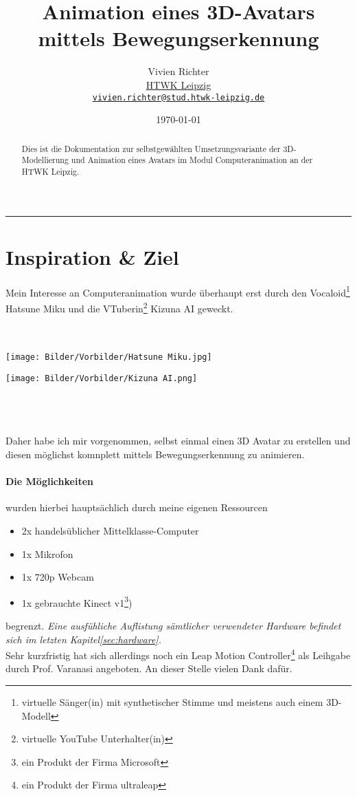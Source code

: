 \documentclass[a4paper, 12pt]{article}
\title{Animation eines 3D-Avatars mittels Bewegungserkennung}
\author{
    \Large Vivien Richter \\ [2mm]
    \normalsize \href{https://www.htwk-leipzig.de}{HTWK Leipzig} \\ \texttt{\href{mailto:vivien.richter@stud.htwk-leipzig.de}{vivien.richter@stud.htwk-leipzig.de}}}
\date{\today{}}
\begin{document}
\pagestyle{main}
\maketitle
\begin{abstract}
    Dies ist die Dokumentation zur selbstgewählten Umsetzungsvariante
    der 3D-Modellierung und Animation eines Avatars
    im Modul \glqq{}Computeranimation\grqq{} an der HTWK Leipzig.
\end{abstract}
\mbox{}\hrule\mbox{}
\tableofcontents
\clearpage
\listoffigures %
\newpage

\section{Inspiration \& Ziel}
\label{sec:inspiration}
Mein Interesse an Computeranimation wurde überhaupt erst durch
den Vocaloid\footnote{virtuelle Sänger(in) mit synthetischer Stimme und meistens auch einem 3D-Modell} Hatsune Miku
und die VTuberin\footnote{virtuelle YouTube Unterhalter(in)} Kizuna AI geweckt.
\\\\\\
\begin{minipage}[c]{0.5\textwidth}
    \centering
    \texttt{[image: Bilder/Vorbilder/Hatsune Miku.jpg]}
\end{minipage}
\begin{minipage}[c]{0.5\textwidth}
    \centering
    \texttt{[image: Bilder/Vorbilder/Kizuna AI.png]}
\end{minipage}
\\\\\\Daher habe ich mir vorgenommen,
selbst einmal einen 3D Avatar zu erstellen
und diesen möglichst komnplett mittels Bewegungserkennung zu animieren.
\paragraph{Die Möglichkeiten} wurden hierbei hauptsächlich durch
meine eigenen Ressourcen
\begin{itemize}
    \item 2x handelsüblicher Mittelklasse-Computer
    \item 1x Mikrofon
    \item 1x 720p Webcam
    \item 1x gebrauchte Kinect v1\footnote{ein Produkt der Firma Microsoft})
\end{itemize}
begrenzt.
\textit{Eine ausfühliche Auflistung sämtlicher verwendeter Hardware befindet sich im letzten Kapitel\ref{sec:hardware}.}
\\Sehr kurzfristig hat sich allerdings noch ein Leap Motion Controller\footnote{ein Produkt der Firma ultraleap}
als Leihgabe durch Prof. Varanasi angeboten.
An dieser Stelle vielen Dank dafür.
\newpage
\end{document}
